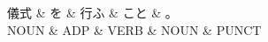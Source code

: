 \documentclass[tikz,border=5pt]{standalone}
\begin{document}
\normalsize
\begin{dependency}[edge unit distance=12.0pt]
    \begin{deptext}[column sep=1em]
        儀式 \& を \& 行ふ \& こと \& 。\\
        NOUN \& ADP \& VERB \& NOUN \& PUNCT\\
    \end{deptext}
\end{dependency}
\end{document}
